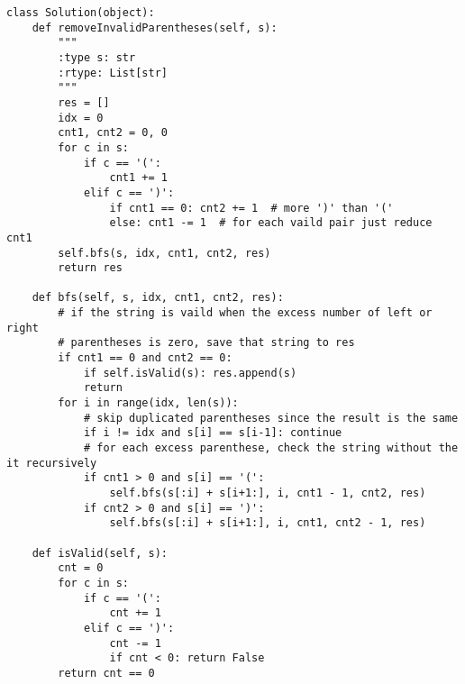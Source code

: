 \begin{lstlisting}
class Solution(object):
    def removeInvalidParentheses(self, s):
        """
        :type s: str
        :rtype: List[str]
        """
        res = []
        idx = 0
        cnt1, cnt2 = 0, 0
        for c in s:
            if c == '(':
                cnt1 += 1
            elif c == ')':
                if cnt1 == 0: cnt2 += 1  # more ')' than '('
                else: cnt1 -= 1  # for each vaild pair just reduce cnt1
        self.bfs(s, idx, cnt1, cnt2, res)
        return res
    
    def bfs(self, s, idx, cnt1, cnt2, res):
        # if the string is vaild when the excess number of left or right 
        # parentheses is zero, save that string to res
        if cnt1 == 0 and cnt2 == 0:
            if self.isValid(s): res.append(s)
            return
        for i in range(idx, len(s)):
            # skip duplicated parentheses since the result is the same
            if i != idx and s[i] == s[i-1]: continue
            # for each excess parenthese, check the string without the it recursively
            if cnt1 > 0 and s[i] == '(':
                self.bfs(s[:i] + s[i+1:], i, cnt1 - 1, cnt2, res)
            if cnt2 > 0 and s[i] == ')':
                self.bfs(s[:i] + s[i+1:], i, cnt1, cnt2 - 1, res)

    def isValid(self, s):
        cnt = 0
        for c in s:
            if c == '(':
                cnt += 1
            elif c == ')':
                cnt -= 1
                if cnt < 0: return False
        return cnt == 0         
\end{lstlisting}

